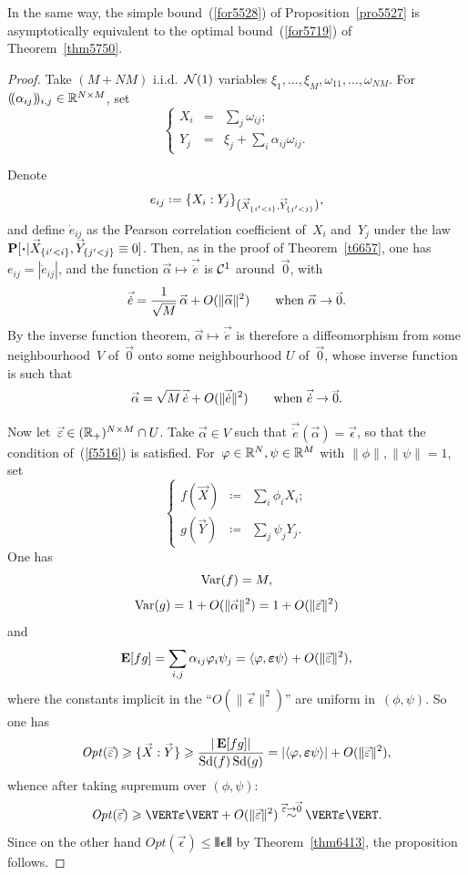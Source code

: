 \begin{Rmk}
In the same way, the simple bound~(\ref{for5528}) of Proposition~\ref{pro5527}
is asymptotically equivalent to the optimal bound~(\ref{for5719}) of Theorem~\ref{thm5750}.
\end{Rmk}

\begin{proof}
Take $(M+NM)$ i.i.d.\ $\mathcal{N}(1)$ variables
$\xi_1,\ldots,\xi_M,\omega_{11},\ldots,\omega_{NM}$.
For~$(\!(\alpha_{ij})\!)_{i,j} \in \mathbb{R}^{N\times M}$,
set
\[ \left\{ \begin{array}{rcl} X_i &=& \sum_j \omega_{ij} ; \\
Y_j &=& \xi_j + \sum_i \alpha_{ij} \omega_{ij} .\end{array} \right.\]

Denote
\[ e_{ij} \coloneqq
\{ X_i:Y_j \}_{\mathlarger{(}\vec{X}_{\{i'<i\}},\vec{Y}_{\{j'<j\}}\mathlarger{)}} ,\]
and define $\dot{e}_{ij}$ as the Pearson correlation coefficient
of~$X_i$ and~$Y_j$ under the law
$\Pr[\Bcdot|\ab \vec{X}_{\{i'<i\}}, \ab {\vec{Y}_{\{j'<j\}}\equiv 0}]$.
Then, as in the proof of Theorem~\ref{t6657}, one has $e_{ij} = |\dot{e}_{ij}|$, and the function
$\vec\alpha \mapsto \vec{\dot{e}}$ is $\mathcal{C}^1$ around~$\vec{0}$, with
\[\label{f8236} \vec{\dot{e}} = \frac{1}{\sqrt{M}}\,\vec\alpha + O(\|\vec\alpha\|^2)
\qquad \text{when $\vec\alpha \longto \vec0$.} \]
%
By the inverse function theorem,
$\vec\alpha \mapsto \vec{\dot{e}}$ is therefore a diffeomorphism
from some neighbourhood~$V$ of~$\vec{0}$ onto some neighbourhood $U$ of~$\vec{0}$,
whose inverse function is such that
\[ \vec{\alpha} = \sqrt{M}\,\vec{\dot{e}} + O(\|\vec{\dot{e}}\|^2) \qquad
\text{when $\vec{\dot{e}} \longto \vec0$.} \]

Now let~$\vec\epsilon \in (\RR_+)^{N\times M} \cap U$.
Take $\vec\alpha\in V$ such that $\vec{\dot{e}}(\vec\alpha) = \vec\epsilon$,
so that the condition of~(\ref{f5516}) is satisfied.
For~$\varphi\in\mathbb{R}^N,\allowbreak {\psi\in\mathbb{R}^M}$ with $\|\phi\|,\|\psi\| = 1$, set
\[\left\{\begin{array}{rcl}
f(\vec{X}) &\coloneqq& \sum_i \phi_i X_i ; \\
g(\vec{Y}) &\coloneqq& \sum_j \psi_j Y_j.
\end{array}\right.\]
%
One has
\[ \operatorname{Var}(f) = M ,\]
\[ \Var(g) = 1 + O(\|\vec\alpha\|^2) = 1 + O(\|\vec\epsilon\|^2) \]
and
\[ \EE[fg] = \sum_{i,j} \alpha_{ij}\phi_i\psi_j
= \langle \phi, \boldsymbol\epsilon \psi \rangle + O(\|\vec\epsilon\|^2) ,\]
where the constants implicit in the ``$O(\|\vec\epsilon\|^2)$'' are uniform
in~$(\phi,\psi)$.
%
So one has
\[ \mathit{Opt}(\vec{\epsilon}) \geq \{ \vec{X} : \vec{Y} \}
\geq \frac{|\EE[fg]|}{\ecty(f)\ecty(g)}
= |\langle \phi, \boldsymbol\epsilon \psi \rangle| + O(\|\vec\epsilon\|^2) ,\]
whence after taking supremum over $(\phi,\psi)$:
\[ \mathit{Opt}(\vec{\epsilon}) \geq \VERT \boldsymbol\epsilon \VERT + O(\|\vec\epsilon\|^2)
\stackrel{\vec\epsilon\longto\vec0}{\sim} \VERT \boldsymbol\epsilon \VERT .\]
Since on the other hand $\mathit{Opt}(\vec{\epsilon}) \leq \VERT\boldsymbol\epsilon\VERT$
by Theorem~\ref{thm6413}, the proposition follows.
\end{proof}

